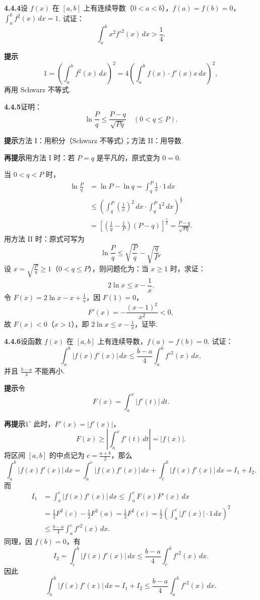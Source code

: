 \documentclass[UTF8,12pt,a4paper,fontset=fandol]{ctexart}
\begin{document}
\noindent\textbf{4.4.4}\quad 设 $f(x)$ 在 $[a,b]$ 上有连续导数（$0<a<b$），$f(a)=f(b)=0$，$\int_a^b f^2(x)\,dx=1$. 试证：
\[
\int_a^b x^2f'^2(x)\,dx>\frac14.
\]

\noindent\textbf{提示}\quad
\[
1=\left(\int_a^b f^2(x)\,dx\right)^2
=4\left(\int_a^b f(x)\cdot f'(x)x\,dx\right)^2,
\]
再用 Schwarz 不等式.

\noindent\textbf{4.4.5}\quad 证明：
\[
\ln\frac Pq\le\frac{P-q}{\sqrt{Pq}}\quad(0<q\le P).
\]

\noindent\textbf{提示}\quad 方法 I：用积分（Schwarz 不等式）；方法 II：用导数.

\noindent\textbf{再提示}\quad 用方法 I 时：若 $P=q$ 是平凡的，原式变为 $0=0$.

当 $0<q<P$ 时，
\[
\begin{aligned}
\ln\frac Pq&=\ln P-\ln q=\int_q^P\frac1x\cdot1\,dx\\
&\le\left(\int_q^P\left(\frac1x\right)^2\,dx\cdot\int_q^P1^2\,dx\right)^{\frac12}\\
&=\left[\left(\frac1q-\frac1P\right)(P-q)\right]^{\frac12}
=\frac{P-q}{\sqrt{Pq}}.
\end{aligned}
\]
用方法 II 时：原式可写为
\[
\ln\frac Pq\le\sqrt{\frac Pq}-\sqrt{\frac qP}.
\]
设 $x=\sqrt{\frac Pq}\ge1$（$0<q\le P$），则问题化为：当 $x\ge1$ 时，求证：
\[
2\ln x\le x-\frac1x.
\]
令 $F(x)=2\ln x-x+\frac1x$，因 $F(1)=0$，
\[
F'(x)=-\frac{(x-1)^2}{x^2}<0,
\]
故 $F(x)<0$（$x>1$），即 $2\ln x\le x-\frac1x$，证毕.

\noindent\textbf{4.4.6}\quad 设函数 $f(x)$ 在 $[a,b]$ 上有连续导数，$f(a)=f(b)=0$. 试证：
\[
\int_a^b |f(x)f'(x)|\,dx\le\frac{b-a}{4}\int_a^b f'^2(x)\,dx,
\]
并且 $\frac{b-a}{4}$ 不能再小.

\noindent\textbf{提示}\quad 令
\[
F(x)=\int_a^x |f'(t)|\,dt.
\]

\noindent\textbf{再提示}\quad $1^\circ$ 此时，$F'(x)=|f'(x)|$，
\[
F(x)\ge\left|\int_a^x f'(t)\,dt\right|=|f(x)|.
\]
将区间 $[a,b]$ 的中点记为 $c=\frac{a+b}{2}$，那么
\[
\int_a^b |f(x)f'(x)|\,dx
=\int_a^c |f(x)f'(x)|\,dx+\int_c^b |f(x)f'(x)|\,dx=I_1+I_2.
\]
而
\begin{equation}
\begin{aligned}
I_1&=\int_a^c |f(x)f'(x)|\,dx
\le\int_a^c F(x)F'(x)\,dx\\
&=\frac12F^2(c)-\frac12F^2(a)
=\frac12F^2(c)
=\frac12\left(\int_a^c |f'(x)|\cdot1\,dx\right)^2\\
&\le\frac{b-a}{4}\int_a^c f'^2(x)\,dx.
\end{aligned}
\tag{1}
\end{equation}
同理，因 $f(b)=0$，有
\[
I_2=\int_c^b |f(x)f'(x)|\,dx
\le\frac{b-a}{4}\int_c^b f'^2(x)\,dx. \tag{2}
\]
因此
\[
\int_a^b |f(x)f'(x)|\,dx=I_1+I_2
\le\frac{b-a}{4}\int_a^b f'^2(x)\,dx.
\]
\end{document}
